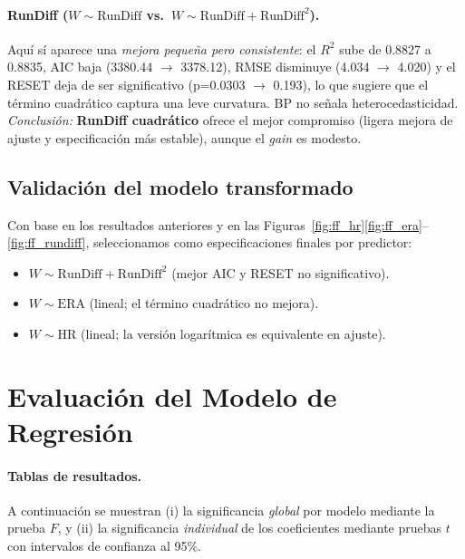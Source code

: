 \documentclass[10pt]{article}
\begin{document}
    \paragraph{RunDiff (\(W \sim \text{RunDiff}\) vs.\ \(W \sim \text{RunDiff}+\text{RunDiff}^2\)).}
    Aquí sí aparece una \textit{mejora pequeña pero consistente}: el \(R^2\) sube de 0.8827 a 0.8835, AIC baja (3380.44 \(\rightarrow\) 3378.12), RMSE disminuye (4.034 \(\rightarrow\) 4.020) y el RESET deja de ser significativo (p=0.0303 \(\rightarrow\) 0.193), lo que sugiere que el término cuadrático captura una leve curvatura. BP no señala heterocedasticidad. 
    \textit{Conclusión:} \textbf{RunDiff cuadrático} ofrece el mejor compromiso (ligera mejora de ajuste y especificación más estable), aunque el \textit{gain} es modesto.

\subsection{Validación del modelo transformado}

    Con base en los resultados anteriores y en las Figuras~\ref{fig:ff_hr}\ref{fig:ff_era}--\ref{fig:ff_rundiff}, seleccionamos como especificaciones finales por predictor:
    \begin{itemize}
        \item \(W \sim \text{RunDiff} + \text{RunDiff}^2\) (mejor AIC y RESET no significativo).
        \item \(W \sim \text{ERA}\) (lineal; el término cuadrático no mejora).
        \item \(W \sim \text{HR}\) (lineal; la versión logarítmica es equivalente en ajuste).
    \end{itemize}
\section{Evaluación del Modelo de Regresión}
\paragraph{Tablas de resultados.}
A continuación se muestran (i) la significancia \emph{global} por modelo mediante la prueba \(F\), y (ii) la significancia 
\emph{individual} de los coeficientes mediante pruebas \(t\) con intervalos de confianza al 95\%.
\end{document}
